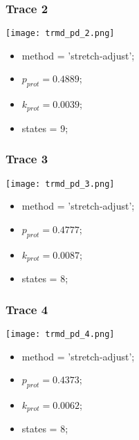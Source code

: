 \subsubsection{Trace 2}
\begin{minipage}[c]{0.7\textwidth}
	\texttt{[image: trmd\_pd\_2.png]}
\end{minipage}
\hfill
\begin{minipage}[c]{0.45\textwidth}
	\begin{itemize}
		\item method = 'stretch-adjust';
		\item $p_{prot}=0.4889$;
		\item $k_{prot}=0.0039$;
		\item states = 9;
	\end{itemize}
\end{minipage}

\subsubsection{Trace 3}
\begin{minipage}[c]{0.7\textwidth}
	\texttt{[image: trmd\_pd\_3.png]}
\end{minipage}
\hfill
\begin{minipage}[c]{0.45\textwidth}
	\begin{itemize}
		\item method = 'stretch-adjust';
		\item $p_{prot}=0.4777$;
		\item $k_{prot}=0.0087$;
		\item states = 8;
	\end{itemize}
\end{minipage}

\subsubsection{Trace 4}
\begin{minipage}[c]{0.7\textwidth}
	\texttt{[image: trmd\_pd\_4.png]}
\end{minipage}
\hfill
\begin{minipage}[c]{0.45\textwidth}
	\begin{itemize}
		\item method = 'stretch-adjust';
		\item $p_{prot}=0.4373$;
		\item $k_{prot}=0.0062$;
		\item states = 8;
	\end{itemize}
\end{minipage}

